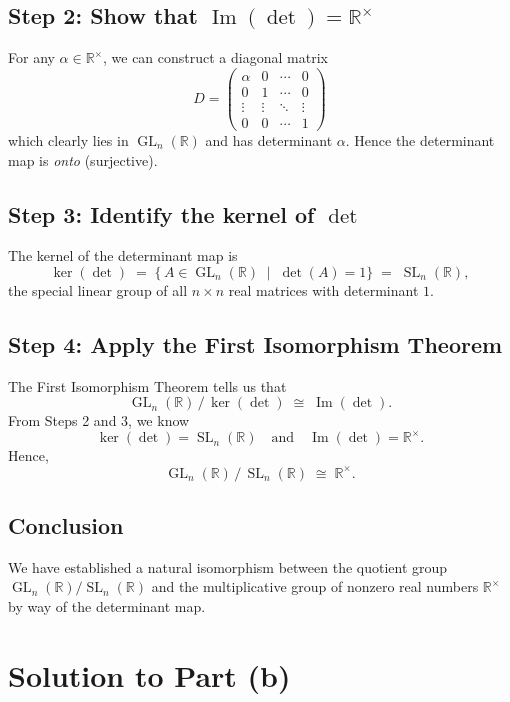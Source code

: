 \documentclass[12pt]{article}
\theoremstyle{definition} %
\theoremstyle{plain} %
\begin{document}
\subsection*{Step 2: Show that $\operatorname{Im}(\det) = \mathbb{R}^\times$}
For any $\alpha \in \mathbb{R}^\times$, we can construct a diagonal matrix 
\[
D =
\begin{pmatrix}
\alpha & 0 & \cdots & 0 \\
0 & 1 & \cdots & 0 \\
\vdots & \vdots & \ddots & \vdots \\
0 & 0 & \cdots & 1
\end{pmatrix}
\]
which clearly lies in $\operatorname{GL}_n(\mathbb{R})$ and has determinant $\alpha$. Hence the determinant map is \emph{onto} (surjective).

\subsection*{Step 3: Identify the kernel of $\det$}
The kernel of the determinant map is
\[
\ker(\det) 
\;=\; 
\{\, A \in \operatorname{GL}_n(\mathbb{R}) \;\mid\; \det(A) = 1 \}
\;=\;
\operatorname{SL}_n(\mathbb{R}),
\]
the special linear group of all $n \times n$ real matrices with determinant $1$.

\subsection*{Step 4: Apply the First Isomorphism Theorem}
The First Isomorphism Theorem tells us that
\[
\operatorname{GL}_n(\mathbb{R}) \,\big/\, \ker(\det)
\;\cong\;
\operatorname{Im}(\det).
\]
From Steps 2 and 3, we know
\[
\ker(\det) = \operatorname{SL}_n(\mathbb{R})
\quad\text{and}\quad
\operatorname{Im}(\det) = \mathbb{R}^\times.
\]
Hence,
\[
\operatorname{GL}_n(\mathbb{R}) \,\big/\, \operatorname{SL}_n(\mathbb{R})
\;\cong\;
\mathbb{R}^\times.
\]

\subsection*{Conclusion}
We have established a natural isomorphism between the quotient group $\operatorname{GL}_n(\mathbb{R})/\operatorname{SL}_n(\mathbb{R})$ and the multiplicative group of nonzero real numbers $\mathbb{R}^\times$ by way of the determinant map.


\section*{Solution to Part (b)}
\end{document}
